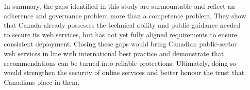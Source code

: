 \documentclass[pdflatex,sn-mathphys-num]{sn-jnl}
\numberwithin{equation}{section}
\theoremstyle{thmstyleone}
\theoremstyle{thmstyletwo}%
\theoremstyle{thmstylethree}%
\begin{document}
\vspace{1em}In summary, the gaps identified in this study are surmountable and reflect an adherence and 
governance problem more than a competence problem. They show that Canada already possesses the technical 
ability and public guidance needed to secure its web services, but has not yet fully aligned requirements 
to ensure consistent deployment. Closing these gaps would bring Canadian public-sector web 
services in line with international best practice and demonstrate that recommendations can be turned into 
reliable protections. Ultimately, doing so would strengthen 
the security of online services and better honour the trust that Canadians place in them.



\newpage 

\end{document}
